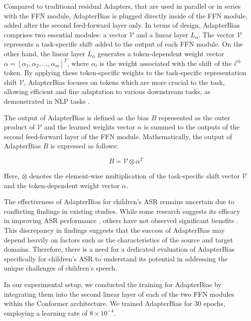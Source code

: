 Compared to traditional residual Adapters, that are used in parallel or in series with the \ac{FFN} module, AdapterBias is plugged directly inside of the \ac{FFN} module, added after the second feed-forward layer only. In terms of design, AdapterBias comprises two essential modules: a vector $\mathcal{V}$ and a linear layer $L_\alpha$. The vector $\mathcal{V}$ represents a task-specific shift added to the output of each \ac{FFN} module. On the other hand, the linear layer $L_\alpha$ generates a token-dependent weight vector $\alpha = [\alpha_1, \alpha_2, ..., \alpha_m]^T$, where $\alpha_i$ is the weight associated with the shift of the $i^{th}$ token. By applying these token-specific weights to the task-specific representation shift $\mathcal{V}$, AdapterBias focuses on tokens which are more crucial to the task, allowing efficient and fine adaptation to various downstream tasks, as demonstrated in \ac{NLP} tasks \cite{fu-etal-2022-adapterbias}.

The output of AdapterBias is defined as the bias $B$ represented as the outer product of $\mathcal{V}$ and the learned weights vector $\alpha$ is summed to the outputs of the second feed-forward layer of the \ac{FFN} module. Mathematically, the output of AdapterBias $B$ is expressed as follows:

\begin{equation}
    B = \mathcal{V} \otimes \alpha^T    
\end{equation}

Here, $\otimes$ denotes the element-wise multiplication of the task-specific shift vector $\mathcal{V}$ and the token-dependent weight vector $\alpha$.


The effectiveness of AdapterBias for children's \ac{ASR} remains uncertain due to conflicting findings in existing studies. While some research suggests its efficacy in improving ASR performance \cite{chen2023exploring}, others have not observed significant benefits \cite{ng23c_interspeech2}. This discrepancy in findings suggests that the success of AdapterBias may depend heavily on factors such as the characteristics of the source and target domains. Therefore, there is a need for a dedicated evaluation of AdapterBias specifically for children's \ac{ASR} to understand its potential in addressing the unique challenges of children's speech. 


In our experimental setup, we conducted the training for AdapterBias by integrating them into the second linear layer of each of the two \ac{FFN} modules within the Conformer architecture. We trained AdapterBias for 30 epochs, employing a learning rate of $8 \times 10^{-4}$.

